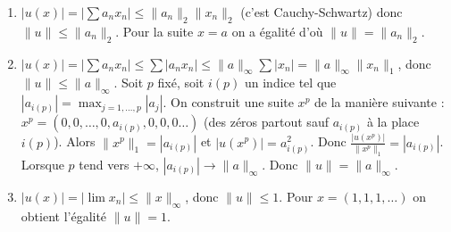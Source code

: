 {{\begin{enumerate}
  \item $|u(x)| = |\sum a_nx_n| \le \|a_n \|_2\| x_n\|_2$ (c'est Cauchy-Schwartz)
donc $\| u \| \le \|a_n \|_2$. Pour la suite $x=a$ on a égalité d'o\`u
$\| u\| = \|a_n \|_2$.
  
  \item $|u(x)| = |\sum a_nx_n| \le \sum |a_nx_n| \le \|a \|_\infty \sum |x_n| = \|a \|_\infty \| x_n\|_1$, donc $\| u \| \le \|a \|_\infty$. 
Soit $p$ fixé, soit $i(p)$ un indice tel que $|a_{i(p)}| = \max_{j=1,\ldots,p} |a_j|$.
On construit une suite $x^p$ de la manière suivante : 
$x^p = (0,0,\ldots,0,a_{i(p)},0,0,0\ldots)$ (des zéros partout sauf $a_{i(p)}$ à la place $i(p)$). Alors $\| x^p \|_1 = |a_{i(p)}|$ et $|u(x^p)| = a_{i(p)}^2$.
Donc $\frac{|u(x^p)|}{\| x^p \|_1} = | a_{i(p)}|$.
Lorsque $p$ tend vers $+\infty$, $| a_{i(p)}| \rightarrow \|a \|_\infty$.
Donc $\| u \| = \|a \|_\infty$.
  
  \item $|u(x)| = |\lim x_n| \le \| x \|_\infty$, donc $\| u \| \le 1$.
Pour $x=(1,1,1,\ldots)$ on obtient l'égalité $\| u \| = 1$.
\end{enumerate}}
}